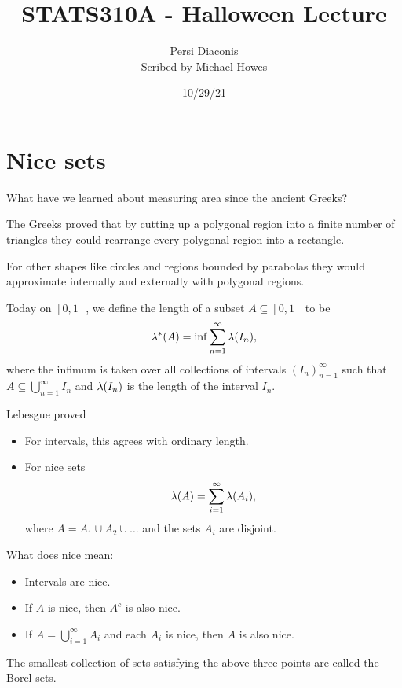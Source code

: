 




\title{STATS310A - Halloween Lecture}
\author{Persi Diaconis\\ Scribed by Michael Howes}
\date{10/29/21}

\pagestyle{fancy}
\fancyhf{}


\maketitle
\tableofcontents
\section{Nice sets}
What have we learned about measuring area since the ancient Greeks?

The Greeks proved that by cutting up a polygonal region into a finite number of triangles they could rearrange every polygonal region into a rectangle. 

For other shapes like circles and regions bounded by parabolas they would approximate internally and externally with polygonal regions.

Today on $[0,1]$, we define the length of a subset $A \subseteq [0,1]$ to be 
\[\lambda^*(A) = \inf \sum_{n=1}^\infty \lambda(I_n), \]
where the infimum is taken over all collections of intervals $(I_n)_{n=1}^\infty$ such that $A \subseteq \bigcup_{n=1}^\infty I_n$ and $\lambda(I_n)$ is the length of the interval $I_n$.

Lebesgue proved
\begin{itemize}
    \item For intervals, this agrees with ordinary length.
    \item For nice sets \[\lambda(A)=\sum_{i=1}^\infty \lambda(A_i), \]  where $A=A_1\cup A_2 \cup \ldots $ and the sets $A_i$ are disjoint.
\end{itemize}
What does nice mean:
\begin{itemize}
    \item Intervals are nice.
    \item If $A$ is nice, then $A^c$ is also nice.
    \item If $A=\bigcup_{i=1}^\infty A_i$ and each $A_i$ is nice, then $A$ is also nice.
\end{itemize}
The smallest collection of sets satisfying the above three points are called the Borel sets.

